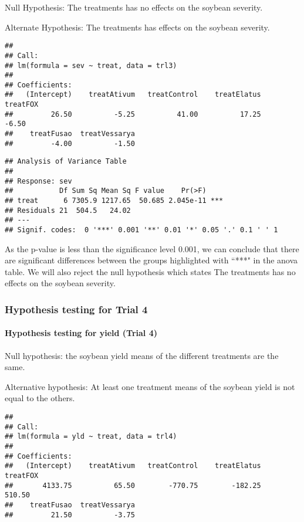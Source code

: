 \documentclass[
]{article}
\begin{document}
Null Hypothesis: The treatments has no effects on the soybean severity.

Alternate Hypothesis: The treatments has effects on the soybean
severity.

\begin{verbatim}
## 
## Call:
## lm(formula = sev ~ treat, data = trl3)
## 
## Coefficients:
##   (Intercept)    treatAtivum   treatControl    treatElatus       treatFOX  
##         26.50          -5.25          41.00          17.25          -6.50  
##    treatFusao  treatVessarya  
##         -4.00          -1.50
\end{verbatim}

\begin{verbatim}
## Analysis of Variance Table
## 
## Response: sev
##           Df Sum Sq Mean Sq F value    Pr(>F)    
## treat      6 7305.9 1217.65  50.685 2.045e-11 ***
## Residuals 21  504.5   24.02                      
## ---
## Signif. codes:  0 '***' 0.001 '**' 0.01 '*' 0.05 '.' 0.1 ' ' 1
\end{verbatim}

As the p-value is less than the significance level 0.001, we can
conclude that there are significant differences between the groups
highlighted with ``***" in the anova table. We will also reject the null
hypothesis which states The treatments has no effects on the soybean
severity.

\hypertarget{hypothesis-testing-for-trial-4}{%
\subsubsection{Hypothesis testing for Trial
4}\label{hypothesis-testing-for-trial-4}}

\hypertarget{hypothesis-testing-for-yield-trial-4}{%
\paragraph{Hypothesis testing for yield (Trial
4)}\label{hypothesis-testing-for-yield-trial-4}}

Null hypothesis: the soybean yield means of the different treatments are
the same.

Alternative hypothesis: At least one treatment means of the soybean
yield is not equal to the others.

\begin{verbatim}
## 
## Call:
## lm(formula = yld ~ treat, data = trl4)
## 
## Coefficients:
##   (Intercept)    treatAtivum   treatControl    treatElatus       treatFOX  
##       4133.75          65.50        -770.75        -182.25         510.50  
##    treatFusao  treatVessarya  
##         21.50          -3.75
\end{verbatim}
\end{document}
